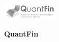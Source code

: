 \documentclass[\main/boa.tex]{subfiles}
\begin{document}
	
	\begin{minipage}[t]{0.915\textwidth}
		\center     
		\includegraphics[width=100px]{img/logos.bw/qfin.png} 
	\end{minipage}
	
	\Large \textbf {QuantFin}
	
	
	\vskip 0.3cm
	\normalsize 
\vskip 1.5cm
	
\end{document}
